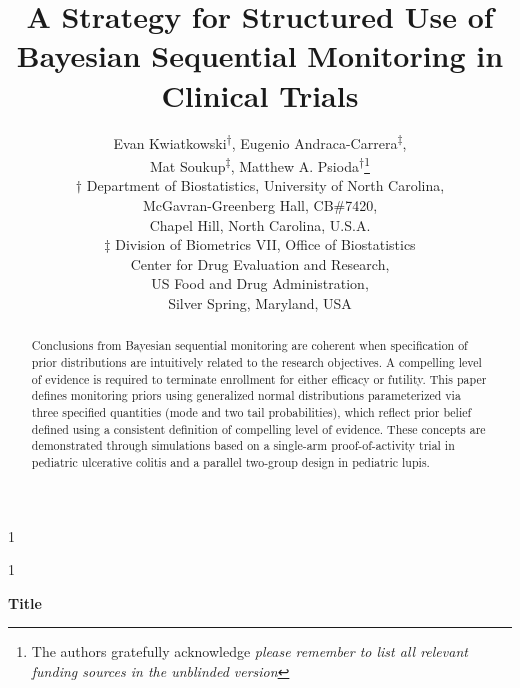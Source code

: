 \documentclass[12pt]{article}
\newcommand{\blind}{1}
\begin{document}
\def\spacingset#1{\renewcommand{\baselinestretch}%
{#1}\small\normalsize} \spacingset{1}



\blind
{
  \title{\bf A Strategy for Structured Use of Bayesian Sequential Monitoring in Clinical Trials}
  \author{Evan Kwiatkowski\textsuperscript{$\dagger$}, 
	        Eugenio Andraca-Carrera\textsuperscript{$\ddagger$},\\
					Mat Soukup\textsuperscript{$\ddagger$},
					\medskip Matthew A. Psioda\textsuperscript{$\dagger$}\thanks{The authors gratefully acknowledge \textit{please remember to list all relevant funding sources in the unblinded version}}\\
	  $\dagger$ Department of Biostatistics,
		University of North Carolina, \\
		McGavran-Greenberg Hall, CB\#7420, \\
		\medskip Chapel Hill, North Carolina, U.S.A.\\
    $\ddagger$ Division of Biometrics VII, Office of Biostatistics \\
		           Center for Drug Evaluation and Research, \\
							 US Food and Drug Administration, \\
							 Silver Spring, Maryland, USA \\									
		}
  \maketitle
} \fi

\blind
{
  \bigskip
  \bigskip
  \bigskip
  \begin{center}
    {\LARGE\bf Title}
\end{center}
  \medskip
} \fi

\bigskip
\begin{abstract}
Conclusions from Bayesian sequential monitoring are coherent when specification of prior distributions are intuitively related to the research objectives. A compelling level of evidence is required to terminate enrollment for either efficacy or futility. This paper defines monitoring priors using generalized normal distributions parameterized via three specified quantities (mode and two tail probabilities), which reflect prior belief defined using a consistent definition of compelling level of evidence. These concepts are demonstrated through simulations based on a single-arm proof-of-activity trial in pediatric ulcerative colitis and a parallel two-group design in pediatric lupis.
\end{abstract}
\end{document}
